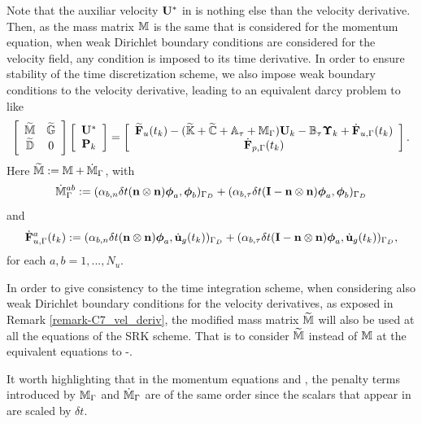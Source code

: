 \begin{remark}
\label{remark-C7_vel_deriv}
Note that the auxiliar velocity $ {\bf U}^* $ in  is nothing else than the velocity derivative. Then, as the mass matrix $ \mathbb{M} $ is the same that is considered for the momentum equation, when weak Dirichlet boundary conditions are considered for the velocity field, any condition is imposed to its time derivative. In order to ensure stability of the time discretization scheme, we also impose weak boundary conditions to the velocity derivative, leading to an equivalent darcy problem to  like 
\begin{equation}
\label{eq-C7_SRK_upeta_RK_p_darcy_weak_deriv}
\left[\begin{array}{cc}
\widetilde{\mathbb{M}}&\widetilde{\mathbb{G}}\\
\widetilde{\mathbb{D}}&0
\end{array}\right]\left[\begin{array}{c}
{\bf U}^*\\
{\bf P}_k
\end{array}\right]=\left[\begin{array}{c}
\widetilde{{\bf F}}_u(t_k)-(\widetilde{\mathbb{K}}+\widetilde{\mathbb{C}}+\mathbb{A}_\tau+\mathbb{M}_\Gamma){\bf U}_k-\mathbb{B}_\tau\boldsymbol{\Upsilon}_k+\dot{{\bf F}}_{u,\Gamma}(t_k)\\
\dot{{\bf F}}_{p,\Gamma}(t_k)
\end{array}\right].
\end{equation}
Here $ \widetilde{\mathbb{M}}:=\mathbb{M}+\dot{\mathbb{M}}_\Gamma $, with 
\begin{equation}
\label{eq-C7_M_deriv}
\dot{\mathbb{M}}_\Gamma^{ab}:=(\alpha_{b,n}\delta t({\bf n}\otimes{\bf n})\boldsymbol{\phi}_{a},\boldsymbol{\phi}_{b})_{\Gamma_D}+(\alpha_{b,\tau}\delta t(\mathbf{I}-{\bf n}\otimes{\bf n})\boldsymbol{\phi}_{a},\boldsymbol{\phi}_{b})_{\Gamma_D}
\end{equation}
and $$ \dot{{\bf F}}_{u,\Gamma}^a(t_k):= (\alpha_{b,n}\delta t({\bf n}\otimes{\bf n})\boldsymbol{\phi}_{a},\dot{{\bf u}}_g(t_k))_{\Gamma_D}+(\alpha_{b,\tau}\delta t(\mathbf{I}-{\bf n}\otimes{\bf n})\boldsymbol{\phi}_{a},\dot{{\bf u}}_g(t_k))_{\Gamma_D},$$ for each $a,b=1,...,N_u$.
\end{remark}	

\begin{remark}
In order to give consistency to the time integration scheme, when considering also weak Dirichlet boundary conditions for the velocity derivatives, as exposed in Remark \ref{remark-C7_vel_deriv}, the modified mass matrix $ \widetilde{\mathbb{M}} $ will also be used at all the equations of the SRK scheme. That is to consider $ \widetilde{\mathbb{M}} $ instead of $ \mathbb{M} $ at the equivalent equations to -.

It worth highlighting that in the momentum equations  and , the penalty terms introduced by $ \mathbb{M}_\Gamma $ and $ \dot{\mathbb{M}}_\Gamma $ are of the same order since the scalars that appear in  are scaled by $ \delta t $.
\end{remark}

